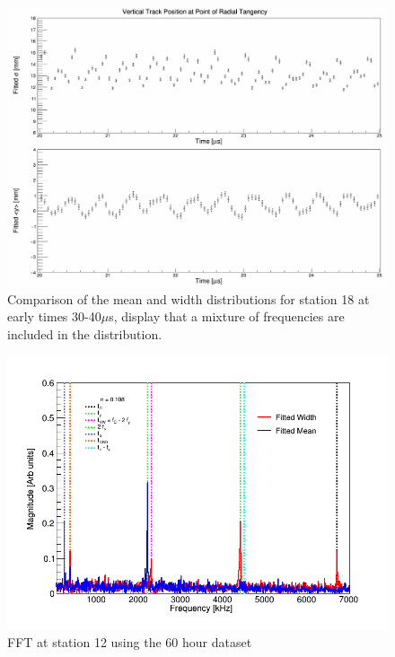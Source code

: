 \begin{figure}[ht]
\centering 
\includegraphics[scale=0.2]{Figures/Width_mean_comparison_station18.png}
\decoRule
\caption{Comparison of the mean and width distributions for station 18 at early times 30-40$\mu$s, display that a mixture of frequencies are included in the distribution.}
\label{fig:Width_mean_comparison_station18}
\end{figure}

\begin{figure}[ht]
\centering 
\includegraphics[scale=0.5]{Figures/FFT_fittedWidth_fittedMean_station12.png}
\decoRule
\caption{FFT at station 12 using the 60 hour dataset}
\label{fig:FFT_fittedWidth_fittedMean_station12.png}
\end{figure}

